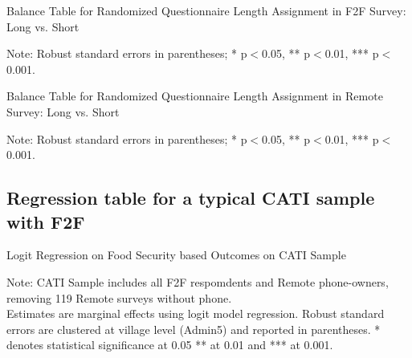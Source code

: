 \documentclass[11pt,harvard]{article}
\begin{document}
\begin{table}[htbp]
	\centering
	\begin{adjustbox}{max width=\textwidth}
		\begin{threeparttable}
			\caption{Balance Table for Randomized Questionnaire Length Assignment in F2F Survey: Long vs. Short}
			\scriptsize
			 
			\label{tab:CAR_Listing_Demo_Balance_F2F_Length}
			\begin{tablenotes}
				\item Note: Robust standard errors in parentheses; * p$<$0.05, ** p$<$0.01, *** p$<$0.001.
			\end{tablenotes}
		\end{threeparttable}
	\end{adjustbox}
\end{table}


\begin{table}[htbp]
	\centering
	\begin{adjustbox}{max width=\textwidth}
		\begin{threeparttable}
			\caption{Balance Table for Randomized Questionnaire Length Assignment in Remote Survey: Long vs. Short}
			\scriptsize
			 
			\label{tab:CAR_Listing_Demo_Balance_RM_Length}
			\begin{tablenotes}
				\item Note: Robust standard errors in parentheses; * p$<$0.05, ** p$<$0.01, *** p$<$0.001.
			\end{tablenotes}
		\end{threeparttable}
	\end{adjustbox}
\end{table}

\pagebreak

\pagebreak

\subsection{Regression table for a typical CATI sample with F2F}
\begin{table}[htbp]
	\centering
	\begin{adjustbox}{max width=\textwidth}
		\begin{threeparttable}
			\caption{Logit Regression on Food Security based Outcomes on CATI Sample}
			\scriptsize
			 
			\label{tab:CAR_FS_Logit_CATI}
			\begin{tablenotes}
				\item Note: CATI Sample includes all F2F respomdents and Remote phone-owners, removing 119 Remote surveys without phone. \\
				Estimates are marginal effects using logit model regression. Robust standard errors are clustered at village level (Admin5) and reported in parentheses. * denotes statistical significance at 0.05 ** at 0.01 and *** at 0.001. 
			\end{tablenotes}
		\end{threeparttable}
	\end{adjustbox}
\end{table}

\pagebreak
\end{document}
